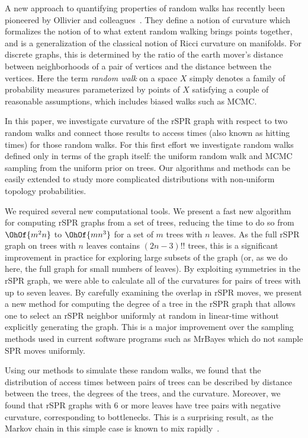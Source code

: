 \documentclass[11pt,onecolumn,conference]{IEEEtran}
\begin{document}
A new approach to quantifying properties of random walks has recently been pioneered by Ollivier and colleagues~\cite{Ollivier2009-bw,Joulin2010-jg}.
They define a notion of curvature which formalizes the notion of to what extent random walking brings points together, and is a generalization of the classical notion of Ricci curvature on manifolds.
For discrete graphs, this is determined by the ratio of the earth mover's distance~\cite{rubner2000earth} between neighborhoods of a pair of vertices and the distance between the vertices.
Here the term \emph{random walk} on a space $X$ simply denotes a family of probability measures parameterized by points of $X$ satisfying a couple of reasonable assumptions, which includes biased walks such as MCMC.

In this paper, we investigate curvature of the rSPR graph with respect to two random walks and connect those results to access times (also known as hitting times) for those random walks.
For this first effort we investigate random walks defined only in terms of the graph itself: the uniform random walk and MCMC sampling from the uniform prior on trees.
Our algorithms and methods can be easily extended to study more complicated distributions with non-uniform topology probabilities.

We required several new computational tools. 
We present a fast new algorithm for computing rSPR graphs from a set of trees, reducing the time to do so from $\OhOf{m^2n}$ to $\OhOf{mn^3}$ for a set of $m$ trees with $n$ leaves.
As the full rSPR graph on trees with $n$ leaves contains $(2n-3)!!$ trees, this is a significant improvement in practice for exploring large subsets of the graph (or, as we do here, the full graph for small numbers of leaves).
By exploiting symmetries in the rSPR graph, we were able to calculate all of the curvatures for pairs of trees with up to seven leaves.
By carefully examining the overlap in rSPR moves, we present a new method for computing the degree of a tree in the rSPR graph that allows one to select an rSPR neighbor uniformly at random in linear-time without explicitly generating the graph.
This is a major improvement over the sampling methods used in current software programs such as MrBayes which do not sample SPR moves uniformly.

Using our methods to simulate these random walks, we found that the distribution of access times between pairs of trees can be described by distance between the trees, the degrees of the trees, and the curvature.
Moreover, we found that rSPR graphs with 6 or more leaves have tree pairs with negative curvature, corresponding to bottlenecks.
This is a surprising result, as the Markov chain in this simple case is known to mix rapidly~\cite{spade2014note}. 
\end{document}
